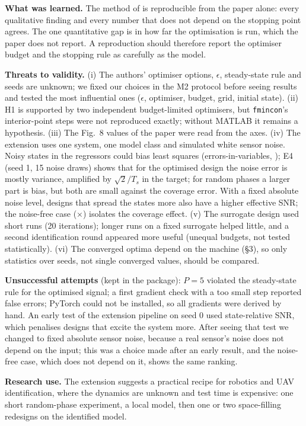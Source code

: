 \textbf{What was learned.} The method of \citet{Kiss2024} is reproducible from the paper alone: every
qualitative finding and every number that does not depend on the stopping point agrees. The one
quantitative gap is in how far the optimisation is run, which the paper does not report. A reproduction
should therefore report the optimiser budget and the stopping rule as carefully as the model.

\textbf{Threats to validity.} (i) The authors' optimiser options, $\epsilon$, steady-state rule and
seeds are unknown; we fixed our choices in the M2 protocol before seeing results and tested the most
influential ones ($\epsilon$, optimiser, budget, grid, initial state). (ii) H1 is supported by two
independent budget-limited optimisers, but \texttt{fmincon}'s interior-point steps were not reproduced
exactly; without MATLAB it remains a hypothesis. (iii) The Fig.~8 values of the paper were read from the
axes. (iv) The extension uses one system, one model class and simulated white sensor noise. Noisy states
in the regressors could bias least squares (errors-in-variables, \citealp{Soderstrom2007}); E4 (seed 1, 15
noise draws) shows that for the optimised design the noise error is mostly variance, amplified by $\sqrt2/T_s$ in
the target; for random phases a larger part is bias, but both are small against the coverage error. With
a fixed absolute noise level, designs that spread the states more also have a higher effective SNR; the
noise-free case (\mFOfullinf$\times$) isolates the coverage effect. (v) The surrogate design used short runs (20 iterations); longer runs on a fixed
surrogate helped little, and a second identification round appeared more useful (unequal budgets, not tested statistically). (vi) The converged
optima depend on the machine (\S3), so only statistics over seeds, not single converged values, should be
compared.

\textbf{Unsuccessful attempts} (kept in the package): $P=5$ violated the steady-state rule for the
optimised signal; a first gradient check with a too small step reported false errors; PyTorch could
not be installed, so all gradients were derived by hand. An early test of the extension pipeline on seed 0 used
state-relative SNR, which penalises designs that excite the system more. After seeing that test we changed to
fixed absolute sensor noise, because a real sensor's noise does not depend on the input; this was a choice
made after an early result, and the noise-free case, which does not depend on it, shows the same ranking.

\textbf{Research use.} The extension suggests a practical recipe for robotics and UAV identification,
where the dynamics are unknown and test time is expensive: one short random-phase experiment, a local
model, then one or two space-filling redesigns on the identified model.
